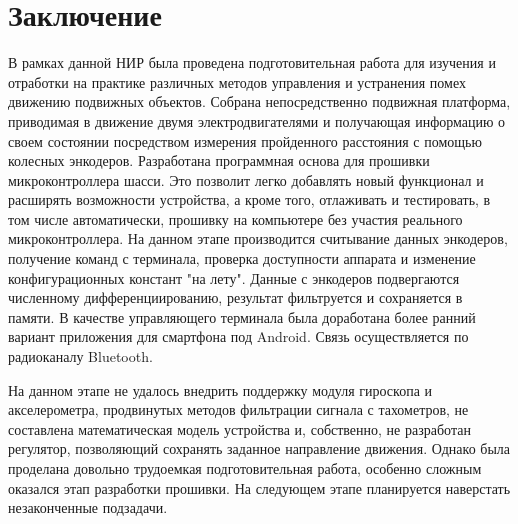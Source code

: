 \documentclass[14pt,a4paper,russian]{scrartcl}
\begin{document}
\newpage
\section*{Заключение}
В рамках данной НИР была проведена подготовительная работа для изучения и отработки
на практике различных методов управления и устранения помех движению
подвижных объектов. Собрана непосредственно подвижная платформа,
приводимая в движение двумя электродвигателями и получающая информацию
о своем состоянии посредством измерения пройденного расстояния с помощью
колесных энкодеров. Разработана программная основа для прошивки микроконтроллера
шасси. Это позволит легко добавлять новый функционал и расширять возможности
устройства, а кроме того, отлаживать и тестировать, в том числе
автоматически, прошивку на компьютере без участия реального микроконтроллера.
На данном этапе производится считывание данных энкодеров,
получение команд с терминала, проверка доступности аппарата и изменение
конфигурационных констант "на лету". Данные с энкодеров подвергаются
численному дифференциированию, результат фильтруется и сохраняется в памяти.
В качестве управляющего терминала была доработана более ранний вариант
приложения для смартфона под Android. Связь осуществляется по радиоканалу
Bluetooth.

На данном этапе не удалось внедрить поддержку модуля гироскопа и 
акселерометра, продвинутых методов фильтрации сигнала с тахометров, не
составлена математическая модель устройства и,
собственно, не разработан регулятор, позволяющий сохранять заданное направление
движения. Однако была проделана довольно трудоемкая подготовительная
работа, особенно сложным оказался этап разработки прошивки. На следующем этапе
планируется наверстать незаконченные подзадачи.


\newpage


\newpage
\end{document}
